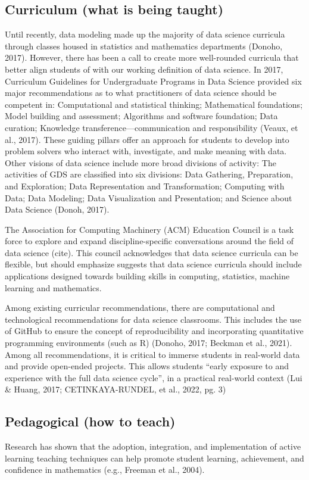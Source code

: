 \documentclass[
  12pt]{article}
\begin{document}
\hypertarget{curriculum-what-is-being-taught}{%
\subsection{Curriculum (what is being
taught)}\label{curriculum-what-is-being-taught}}

Until recently, data modeling made up the majority of data science
curricula through classes housed in statistics and mathematics
departments (Donoho, 2017). However, there has been a call to create
more well-rounded curricula that better align students of with our
working definition of data science. In 2017, Curriculum Guidelines for
Undergraduate Programs in Data Science provided six major
recommendations as to what practitioners of data science should be
competent in: Computational and statistical thinking; Mathematical
foundations; Model building and assessment; Algorithms and software
foundation; Data curation; Knowledge transference---communication and
responsibility (Veaux, et al., 2017). These guiding pillars offer an
approach for students to develop into problem solvers who interact with,
investigate, and make meaning with data. Other visions of data science
include more broad divisions of activity: The activities of GDS are
classified into six divisions: Data Gathering, Preparation, and
Exploration; Data Representation and Transformation; Computing with
Data; Data Modeling; Data Visualization and Presentation; and Science
about Data Science (Donoh, 2017).

The Association for Computing Machinery (ACM) Education Council is a
task force to explore and expand discipline-specific conversations
around the field of data science (cite). This council acknowledges that
data science curricula can be flexible, but should emphasize suggests
that data science curricula should include applications designed towards
building skills in computing, statistics, machine learning and
mathematics.

Among existing curricular recommendations, there are computational and
technological recommendations for data science classrooms. This includes
the use of GitHub to ensure the concept of reproducibility and
incorporating quantitative programming environments (such as R) (Donoho,
2017; Beckman et al., 2021). Among all recommendations, it is critical
to immerse students in real-world data and provide open-ended projects.
This allows students ``early exposure to and experience with the full
data science cycle'', in a practical real-world context (Lui \& Huang,
2017; CETINKAYA-RUNDEL, et al., 2022, pg. 3)

\hypertarget{pedagogical-how-to-teach}{%
\subsection{Pedagogical (how to teach)}\label{pedagogical-how-to-teach}}

Research has shown that the adoption, integration, and implementation of
active learning teaching techniques can help promote student learning,
achievement, and confidence in mathematics (e.g., Freeman et al., 2004).


  
\end{document}
